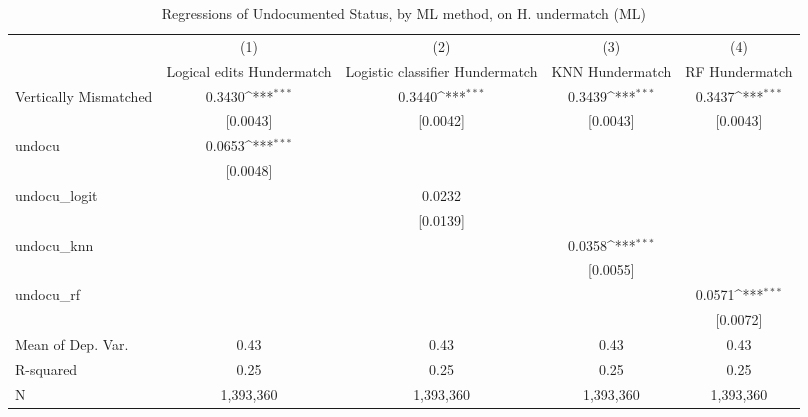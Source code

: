 \begin{table}[htbp]\centering
\def\sym#1{\ifmmode^{#1}\else\(^{#1}\)\fi}
\caption{Regressions of Undocumented Status, by ML method, on H. undermatch (ML)}
\begin{tabular}{l*{4}{c}}
\toprule
                    &\multicolumn{1}{c}{(1)}         &\multicolumn{1}{c}{(2)}         &\multicolumn{1}{c}{(3)}         &\multicolumn{1}{c}{(4)}         \\
                    &Logical edits Hundermatch         &Logistic classifier Hundermatch         &KNN Hundermatch         &RF Hundermatch         \\
\midrule
Vertically Mismatched&      0.3430\sym{***}&      0.3440\sym{***}&      0.3439\sym{***}&      0.3437\sym{***}\\
                    &    [0.0043]         &    [0.0042]         &    [0.0043]         &    [0.0043]         \\
\addlinespace
undocu              &      0.0653\sym{***}&                     &                     &                     \\
                    &    [0.0048]         &                     &                     &                     \\
\addlinespace
undocu\_logit        &                     &      0.0232         &                     &                     \\
                    &                     &    [0.0139]         &                     &                     \\
\addlinespace
undocu\_knn          &                     &                     &      0.0358\sym{***}&                     \\
                    &                     &                     &    [0.0055]         &                     \\
\addlinespace
undocu\_rf           &                     &                     &                     &      0.0571\sym{***}\\
                    &                     &                     &                     &    [0.0072]         \\
\midrule
Mean of Dep. Var.   &        0.43         &        0.43         &        0.43         &        0.43         \\
R-squared           &        0.25         &        0.25         &        0.25         &        0.25         \\
N                   &   1,393,360         &   1,393,360         &   1,393,360         &   1,393,360         \\

\end{tabular}
\end{table}
